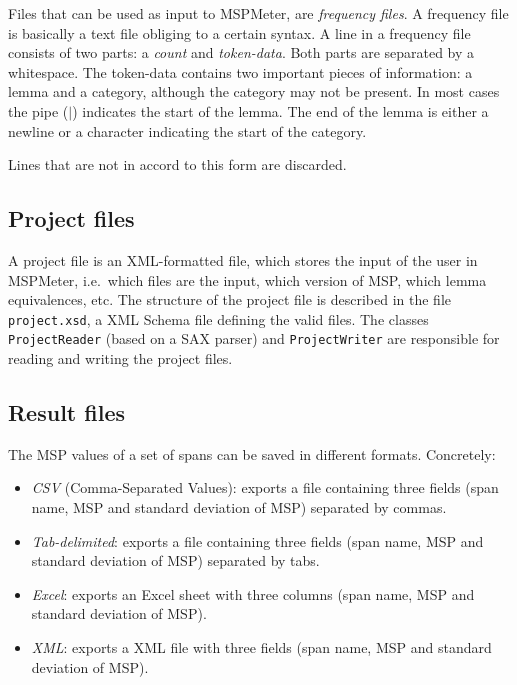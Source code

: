 \documentclass{article}
\begin{document}
Files that can be used as input to MSPMeter, are \emph{frequency files}. A frequency file is basically a text file obliging to a certain syntax. A line in a frequency file consists of two parts: a \emph{count} and \emph{token-data}. Both parts are separated by a whitespace. The token-data contains two important pieces of information: a lemma and a category, although the category may not be present. In most cases the pipe ($|$) indicates the start of the lemma. The end of the lemma is either a newline or a character indicating the start of the category. 

Lines that are not in accord to this form are discarded.


\subsection{Project files}

A project file is an XML-formatted file, which stores the input of the user in MSPMeter, i.e.\ which files are the input, which version of MSP, which lemma equivalences, etc. The structure of the project file is described in the file \texttt{project.xsd}, a XML Schema file defining the valid files. The classes \texttt{ProjectReader} (based on a SAX parser) and \texttt{ProjectWriter} are responsible for reading and writing the project files.


\subsection{Result files}

The MSP values of a set of spans can be saved in different formats. Concretely:
\begin{itemize}
\item \emph{CSV} (Comma-Separated Values): exports a file containing three fields (span name, MSP and standard deviation of MSP) separated by commas. 

\item \emph{Tab-delimited}: exports a file containing three fields (span name, MSP and standard deviation of MSP) separated by tabs. 

\item \emph{Excel}: exports an Excel sheet with three columns (span name, MSP and standard deviation of MSP). 

\item \emph{XML}: exports a XML file with three fields (span name, MSP and standard deviation of MSP).
\end{itemize}
\end{document}
